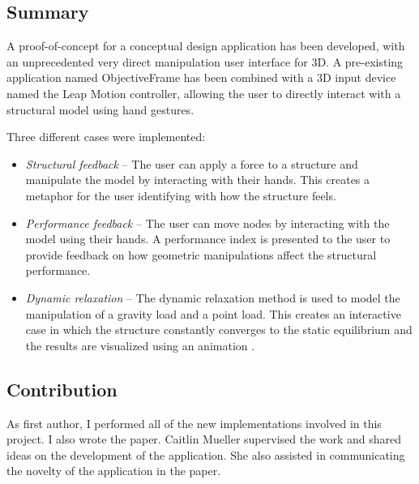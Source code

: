 \subsection*{Summary}

A proof-of-concept for a conceptual design application has been developed, with an unprecedented very direct manipulation user interface for 3D. A pre-existing application named ObjectiveFrame \cite{lindemann2001objectiveframe} has been combined with a 3D input device named the Leap Motion controller, allowing the user to directly interact with a structural model using hand gestures.

Three different cases were implemented:

\begin{itemize} 
\item \textit{Structural feedback} – The user can apply a force to a structure and manipulate the model by interacting with their hands. This creates a metaphor for the user identifying with how the structure feels.
\item \textit{Performance feedback} – The user can move nodes by interacting with the model using their hands. A performance index is presented to the user to provide feedback on how geometric manipulations affect the structural performance.
\item \textit{Dynamic relaxation} – The dynamic relaxation method is used to model the manipulation of a gravity load and a point load. This creates an interactive case in which the structure constantly converges to the static equilibrium and the results are visualized using an animation .
\end{itemize} 

\subsection*{Contribution}
As first author, I performed all of the new implementations involved in this project. I also wrote the paper. Caitlin Mueller supervised the work and shared ideas on the development of the application. She also assisted in communicating the novelty of the application in the paper.


